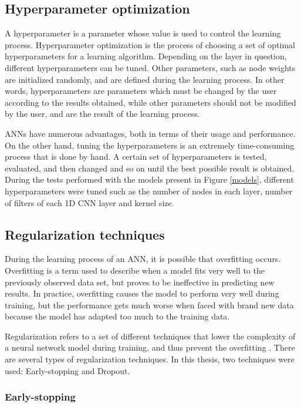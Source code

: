 \subsection{Hyperparameter optimization}

A hyperparameter is a parameter whose value is used to control the learning process. Hyperparameter optimization is the process of choosing a set of optimal hyperparameters for a learning algorithm. Depending on the layer in question, different hyperparameters can be tuned. Other parameters, such as node weights are initialized randomly, and are defined during the learning process. In other words, hyperparameters are parameters which must be changed by the user according to the results obtained, while other parameters should not be modified by the user, and are the result of the learning process.

\ac{ANN}s have numerous advantages, both in terms of their usage and performance. On the other hand, tuning the hyperparameters is an extremely time-consuming process that is done by hand. A certain set of hyperparameters is tested, evaluated, and then changed and so on until the best possible result is obtained. During the tests performed with the models present in Figure \ref{models}, different hyperparameters were tuned such as the number of nodes in each layer, number of filters of each \ac{1D CNN} layer and kernel size.

\subsection{Regularization techniques}

During the learning process of an \ac{ANN}, it is possible that overfitting occurs. Overfitting is a term used to describe when a model fits very well to the previously observed data set, but proves to be ineffective in predicting new results. In practice, overfitting causes the model to perform very well during training, but the performance gets much worse when faced with brand new data because the model has adapted too much to the training data.  

Regularization refers to a set of different techniques that lower the complexity of a neural network model during training, and thus prevent the overfitting \cite{reg0}. There are several types of regularization techniques. In this thesis, two techniques were used: Early-stopping and Dropout.

\subsubsection{Early-stopping}\label{sec:early}

